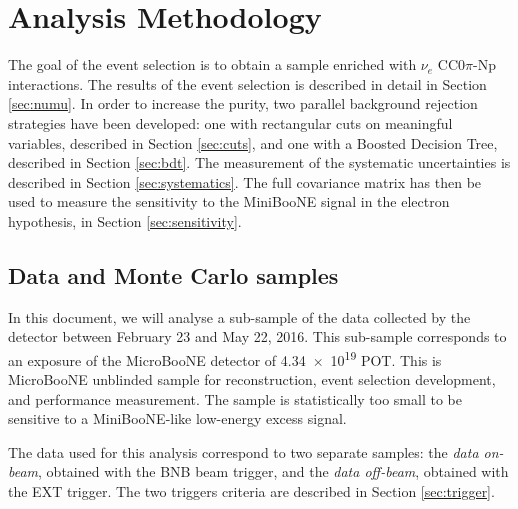 \section{Analysis Methodology}
\label{sec:methodology}
The goal of the event selection is to obtain a sample enriched with $\nu_{e}$ CC0$\pi$-Np interactions. The results of the event selection is described in detail in Section \ref{sec:numu}. In order to increase the purity, two parallel background rejection strategies have been developed: one with rectangular cuts on meaningful variables, described in Section \ref{sec:cuts}, and one with a Boosted Decision Tree, described in Section \ref{sec:bdt}.
The measurement of the systematic uncertainties is described in Section \ref{sec:systematics}. The full covariance matrix has then be used to measure the sensitivity to the MiniBooNE signal in the electron hypothesis, in Section \ref{sec:sensitivity}.

\subsection{Data and Monte Carlo samples}\label{sec:data}
In this document, we will analyse a sub-sample of the data collected by the detector between February 23 and May 22, 2016. This sub-sample corresponds to an exposure of the MicroBooNE detector of \num{4.34e19} POT. This is MicroBooNE unblinded sample for reconstruction, event selection development, and performance measurement. The sample is statistically too small to be sensitive to a MiniBooNE-like low-energy excess signal. 

The data used for this analysis correspond to two separate samples: the \emph{data on-beam}, obtained with the BNB beam trigger, and the \emph{data off-beam}, obtained with the EXT trigger. The two triggers criteria are described in Section \ref{sec:trigger}.

